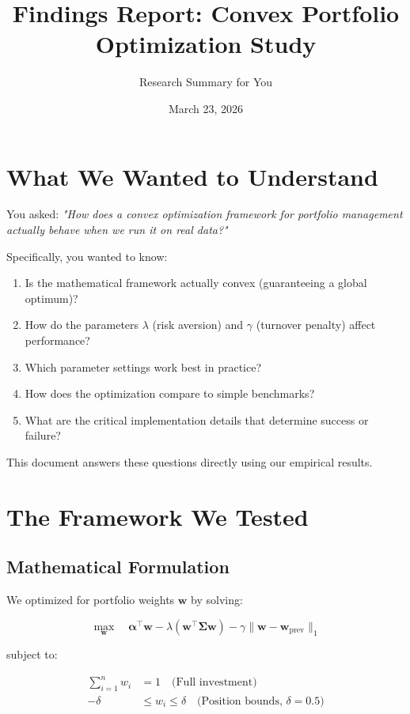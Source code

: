 \documentclass[a4paper,12pt]{article}
\title{\textbf{Findings Report: Convex Portfolio Optimization Study}}
\author{Research Summary for You}
\date{March 23, 2026}
\begin{document}
\maketitle

\section{What We Wanted to Understand}

You asked: \textit{"How does a convex optimization framework for portfolio management actually behave when we run it on real data?"}

Specifically, you wanted to know:
\begin{enumerate}
    \item Is the mathematical framework actually convex (guaranteeing a global optimum)?
    \item How do the parameters $\lambda$ (risk aversion) and $\gamma$ (turnover penalty) affect performance?
    \item Which parameter settings work best in practice?
    \item How does the optimization compare to simple benchmarks?
    \item What are the critical implementation details that determine success or failure?
\end{enumerate}

This document answers these questions directly using our empirical results.

\section{The Framework We Tested}

\subsection{Mathematical Formulation}

We optimized for portfolio weights $\mathbf{w}$ by solving:

\begin{equation}
\max_{\mathbf{w}} \quad \boldsymbol{\alpha}^\top \mathbf{w} - \lambda (\mathbf{w}^\top \boldsymbol{\Sigma} \mathbf{w}) - \gamma \|\mathbf{w} - \mathbf{w}_{\text{prev}}\|_1
\end{equation}

subject to:

\begin{align}
\sum_{i=1}^{n} w_i &= 1 \quad \text{(Full investment)} \\
-\delta &\leq w_i \leq \delta \quad \text{(Position bounds, $\delta=0.5$)}
\end{align}
\end{document}
